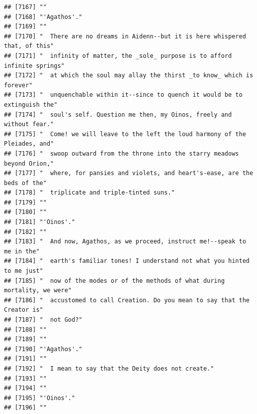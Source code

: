 \documentclass{article}\usepackage[]{graphicx}\usepackage[]{color}
\makeatletter
\newenvironment{kframe}{%
 \def\at@end@of@kframe{}%
 \ifinner\ifhmode%
  \def\at@end@of@kframe{\end{minipage}}%
  \begin{minipage}{\columnwidth}%
 \fi\fi%
 \def\FrameCommand##1{\hskip\@totalleftmargin \hskip-\fboxsep
 \colorbox{shadecolor}{##1}\hskip-\fboxsep
     \hskip-\linewidth \hskip-\@totalleftmargin \hskip\columnwidth}%
 \MakeFramed {\advance\hsize-\width
   \@totalleftmargin\z@ \linewidth\hsize
   \@setminipage}}%
 {\par\unskip\endMakeFramed%
 \at@end@of@kframe}
\newenvironment{knitrout}{}{} %
\makeatother
\begin{document}
\begin{knitrout}
\begin{kframe}
\begin{verbatim}
## [7167] ""                                                                            
## [7168] "'Agathos'."                                                                  
## [7169] ""                                                                            
## [7170] "  There are no dreams in Aidenn--but it is here whispered that, of this"     
## [7171] "  infinity of matter, the _sole_ purpose is to afford infinite springs"      
## [7172] "  at which the soul may allay the thirst _to know_ which is forever"         
## [7173] "  unquenchable within it--since to quench it would be to extinguish the"     
## [7174] "  soul's self. Question me then, my Oinos, freely and without fear."         
## [7175] "  Come! we will leave to the left the loud harmony of the Pleiades, and"     
## [7176] "  swoop outward from the throne into the starry meadows beyond Orion,"       
## [7177] "  where, for pansies and violets, and heart's-ease, are the beds of the"     
## [7178] "  triplicate and triple-tinted suns."                                        
## [7179] ""                                                                            
## [7180] ""                                                                            
## [7181] "'Oinos'."                                                                    
## [7182] ""                                                                            
## [7183] "  And now, Agathos, as we proceed, instruct me!--speak to me in the"         
## [7184] "  earth's familiar tones! I understand not what you hinted to me just"       
## [7185] "  now of the modes or of the methods of what during mortality, we were"      
## [7186] "  accustomed to call Creation. Do you mean to say that the Creator is"       
## [7187] "  not God?"                                                                  
## [7188] ""                                                                            
## [7189] ""                                                                            
## [7190] "'Agathos'."                                                                  
## [7191] ""                                                                            
## [7192] "  I mean to say that the Deity does not create."                             
## [7193] ""                                                                            
## [7194] ""                                                                            
## [7195] "'Oinos'."                                                                    
## [7196] ""                                                                            

\end{verbatim}
\end{kframe}
\end{knitrout}
\end{document}
